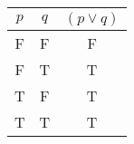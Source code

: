 \begin{tabular}{|c|c||c|}
\hline
$ p $ & $ q $ & $ (p \vee q) $ \\
\hline
F & F & F \\
F & T & T \\
T & F & T \\
T & T & T \\
\hline
\end{tabular}
